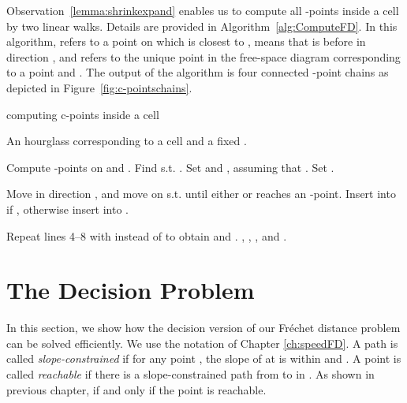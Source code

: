 \documentclass[12pt]{dalthesis}
\newcommand{\Frechet}{Fr\'echet }
\begin{document}
Observation~\ref{lemma:shrinkexpand} enables us to compute all -points inside a cell
by two linear walks. Details are provided in Algorithm~\ref{alg:ComputeFD}.
In this algorithm,  refers to a point on  which is closest to ,
 means that 
 is before  in direction ,
and  refers to the unique point in the free-space diagram 
corresponding to a point  and .
The output of the algorithm is four connected -point chains
as depicted in Figure~\ref{fig:c-pointschains}.


\renewcommand{\algorithmicrequire}{\textbf{Input:}}

\begin{algorithm} [h]
\caption {\sc computing c-points inside a cell } \label{alg:ComputeFD}
\begin{algorithmic}[1]
	\vspace{0.5em}
	\baselineskip
	\REQUIRE  An hourglass  corresponding to a cell  and a fixed .
	
	\STATE \label{lp:extend} Compute -points on  and .
	\STATE \label{lp:q1q2} Find  s.t. .
	\STATE \label{lp:initialization0} Set  and  , assuming that .
	\STATE \label{lp:initialization} Set .
	
		\STATE \label{lp:move} Move  in direction , and 
			move  on  s.t.  
			until either  or  reaches an -point.	
		\IF{}
		\STATE Insert  into  if  , 
			otherwise  insert  into .
		\ENDIF
	\ENDWHILE
	
	\STATE Repeat lines 4--8 with  instead of  to obtain  and .
	\RETURN , , , and .
\end{algorithmic}
\end{algorithm}









\section{The Decision Problem} \label{sec:decision}

In this section, we show how the decision version of 
our \Frechet distance problem can be solved efficiently.
We use the notation of Chapter \ref{ch:speedFD}.
A path  is called {\em slope-constrained\/}
if for any point ,
the slope of  at  is within 
 and .
A point  is called {\em reachable\/} 
if there is a slope-constrained path from  to  in .
As shown in previous chapter,  if and only if the point  is reachable.
\end{document}
